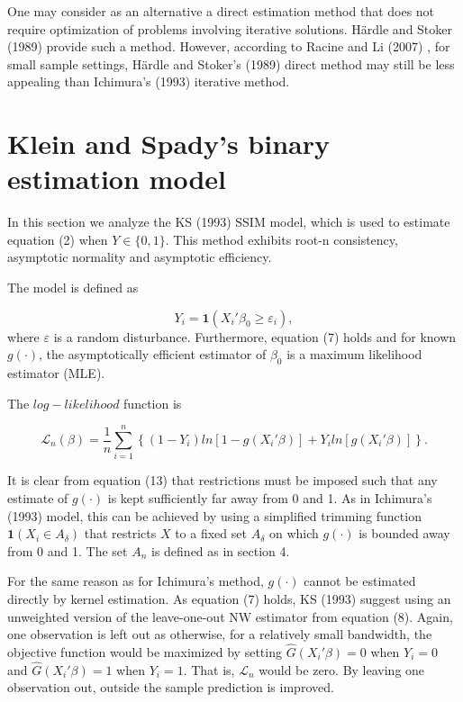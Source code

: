 One may consider  as an alternative a direct estimation method that does not require optimization of problems involving iterative solutions.  H{\"a}rdle and Stoker (1989) \cite{[22]} provide such a method. However, according to Racine and Li (2007) \cite{[1]}, for small sample settings, H{\"a}rdle and Stoker's (1989) \cite{[22]} direct method may still be less appealing than Ichimura's (1993) \cite{[6]} iterative method.

\section{Klein and Spady's binary estimation model} %
\label{sec:section_about_references_within_the_document}
In this section we analyze the KS (1993) \cite{[12]} SSIM model, which is used to estimate equation (2) when $Y \in \{0,1\}$. This method exhibits root-n consistency, asymptotic normality and asymptotic efficiency. 

The model is defined as

\begin{equation}
Y_i =  \mathbf{1}{(X_i'\beta_0 \geq \varepsilon_i)},
\end{equation}
where $\varepsilon$ is a random disturbance. Furthermore, equation (7) holds and for known $g(\cdot)$, the asymptotically efficient estimator of $\beta_0$ is a maximum likelihood estimator (MLE). 

The $log-likelihood$ function is

\begin{equation}
\mathcal{L}_n(\beta) = \frac{1}{n}\sum_{i=1}^n \left\{ (1 - Y_i)ln[ 1 - g(X_i'\beta)] + Y_iln[g(X_i'\beta)] \right\}.
\end{equation}

It is clear from equation (13) that restrictions must be imposed such that any estimate of $g(\cdot)$ is kept sufficiently far away from 0 and 1. As in Ichimura's (1993) \cite{[6]} model, this can be achieved by using a simplified trimming function $\mathbf{1}{(X_i \in A_\delta)}$ that restricts $X$ to a fixed set $A_\delta$ on which $g(\cdot)$ is bounded away from 0 and 1. The set $A_n$ is defined as in section 4.

For the same reason as for Ichimura's method, $g(\cdot)$ cannot be estimated directly by kernel estimation. As equation (7) holds, KS (1993) \cite{[12]} suggest using an unweighted version of the leave-one-out NW estimator from equation (8). Again, one observation is left out as otherwise, for a relatively small bandwidth, the objective function would be maximized by setting $\hat{G}(X_i'\beta)=0$ when $Y_i=0$ and $\hat{G}(X_i'\beta)=1$ when $Y_i=1$. That is, $\mathcal{L}_n$ would be zero. By leaving one observation out, outside the sample prediction is improved. 

